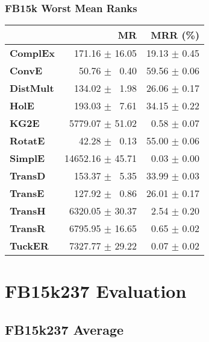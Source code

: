 \documentclass{article}
\begin{document}
\subsubsection{FB15k Worst Mean Ranks}
    \begin{center}
    \begin{tabular}{lrr}
\toprule
{} &                MR &      MRR (\%) \\
\midrule
\textbf{ComplEx } &  $\phantom{5}$$\phantom{5}$171.16 $\pm$ 16.05 &  19.13 $\pm$ 0.45 \\
\textbf{ConvE   } &  $\phantom{5}$$\phantom{5}$$\phantom{5}$50.76 $\pm$ $\phantom{5}$0.40 &  59.56 $\pm$ 0.06 \\
\textbf{DistMult} &  $\phantom{5}$$\phantom{5}$134.02 $\pm$ $\phantom{5}$1.98 &  26.06 $\pm$ 0.17 \\
\textbf{HolE    } &  $\phantom{5}$$\phantom{5}$193.03 $\pm$ $\phantom{5}$7.61 &  34.15 $\pm$ 0.22 \\
\textbf{KG2E    } &  $\phantom{5}$5779.07 $\pm$ 51.02 &  $\phantom{5}$0.58 $\pm$ 0.07 \\
\textbf{RotatE  } &  $\phantom{5}$$\phantom{5}$$\phantom{5}$42.28 $\pm$ $\phantom{5}$0.13 &  55.00 $\pm$ 0.06 \\
\textbf{SimplE  } &  14652.16 $\pm$ 45.71 &  $\phantom{5}$0.03 $\pm$ 0.00 \\
\textbf{TransD  } &  $\phantom{5}$$\phantom{5}$153.37 $\pm$ $\phantom{5}$5.35 &  33.99 $\pm$ 0.03 \\
\textbf{TransE  } &  $\phantom{5}$$\phantom{5}$127.92 $\pm$ $\phantom{5}$0.86 &  26.01 $\pm$ 0.17 \\
\textbf{TransH  } &  $\phantom{5}$6320.05 $\pm$ 30.37 &  $\phantom{5}$2.54 $\pm$ 0.20 \\
\textbf{TransR  } &  $\phantom{5}$6795.95 $\pm$ 16.65 &  $\phantom{5}$0.65 $\pm$ 0.02 \\
\textbf{TuckER  } &  $\phantom{5}$7327.77 $\pm$ 29.22 &  $\phantom{5}$0.07 $\pm$ 0.02 \\
\bottomrule
\end{tabular}

    \end{center}

\section{FB15k237 Evaluation}
\subsection{FB15k237 Average}
\end{document}
